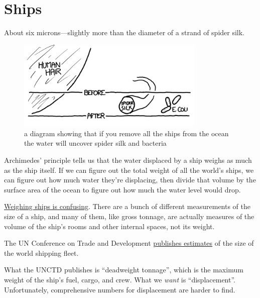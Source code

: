 {
\chapter{Ships}
}

\hfill{}

{About six microns—slightly more than the diameter of a strand of spider silk.}

\begin{figure}[!htbp]
\centering
\includegraphics[scale=0.5, max width=0.8\textwidth]{imgs/a/33/ships_comparison.png}
\caption{a diagram showing that if you remove all the ships from the ocean the water will uncover spider silk and bacteria}
\end{figure}

{Archimedes’ principle tells us that the water displaced by a ship weighs as much as the ship itself. If we can figure out the total weight of all the world’s ships, we can figure out how much water they’re displacing, then divide that volume by the surface area of the ocean to figure out how much the water level would drop.}

{ \href{http://www.pomorci.com/Zanimljivosti/TONNAGE\%20MEASUREMENT\%20OF\%20SHIPS.pdf}{Weighing ships is confusing}. There are a bunch of different measurements of the size of a ship, and many of them, like gross tonnage, are actually measures of the volume of the ship’s rooms and other internal spaces, not its weight.}

{The UN Conference on Trade and Development \href{http://unctad.org/en/Docs/rmt2011ch2\_en.pdf}{publishes estimates} of the size of the world shipping fleet.}

{What the UNCTD publishes is “deadweight tonnage”, which is the maximum weight of the ship’s fuel, cargo, and crew. What we \emph{want} is “displacement”. Unfortunately, comprehensive numbers for displacement are harder to find.}

